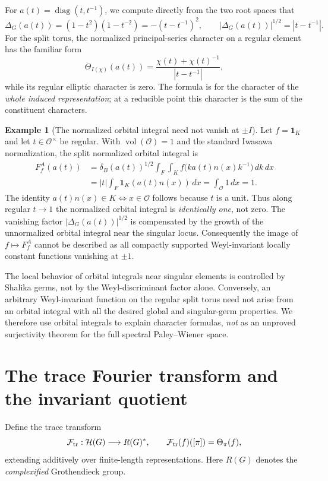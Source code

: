 \documentclass[12pt,letterpaper]{amsart}
\numberwithin{equation}{section}
\theoremstyle{definition}
\newtheorem{example}[theorem]{Example}
\theoremstyle{remark}
\newcommand{\calH}{\mathcal H}
\newcommand{\vol}{\operatorname{vol}}
\newcommand{\diag}{\operatorname{diag}}
\begin{document}
For $a(t)=\diag(t,t^{-1})$, we compute directly from the two root spaces that
\begin{equation}\label{eq:disc}
\Delta_G(a(t))=(1-t^2)(1-t^{-2})=-(t-t^{-1})^2,
\qquad |\Delta_G(a(t))|^{1/2}=|t-t^{-1}|.
\end{equation}
For the split torus, the normalized principal-series character on a regular element has the familiar form
\begin{equation}\label{eq:pschar}
\Theta_{I(\chi)}(a(t))=\frac{\chi(t)+\chi(t)^{-1}}{|t-t^{-1}|},
\end{equation}
while its regular elliptic character is zero.  The formula is for the character of the \emph{whole induced representation}; at a reducible point this character is the sum of the constituent characters.

\begin{example}[The normalized orbital integral need not vanish at $\pm I$]\label{ex:K}
Let $f=\mathbf 1_K$ and let $t\in\mathcal O^\times$ be regular. With $\vol(\mathcal O)=1$ and the standard Iwasawa normalization, the split normalized orbital integral is
\begin{align*}
F_f^A(a(t))
&=\delta_B(a(t))^{1/2}\int_F\int_K f\bigl(k a(t)n(x)k^{-1}\bigr)\,dk\,dx\\
&=|t|\int_F\mathbf 1_K(a(t)n(x))\,dx
=\int_{\mathcal O}1\,dx=1.
\end{align*}
The identity $a(t)n(x)\in K\iff x\in\mathcal O$ follows because $t$ is a unit. Thus along regular $t\to1$ the normalized orbital integral is \emph{identically one}, not zero.  The vanishing factor $|\Delta_G(a(t))|^{1/2}$ is compensated by the growth of the unnormalized orbital integral near the singular locus.  Consequently the image of $f\mapsto F_f^A$ cannot be described as all compactly supported Weyl-invariant locally constant functions vanishing at $\pm1$.
\end{example}

The local behavior of orbital integrals near singular elements is controlled by Shalika germs, not by the Weyl-discriminant factor alone.  Conversely, an arbitrary Weyl-invariant function on the regular split torus need not arise from an orbital integral with all the desired global and singular-germ properties.  We therefore use orbital integrals to explain character formulas, \emph{not} as an unproved surjectivity theorem for the full spectral Paley--Wiener space.

\section{The trace Fourier transform and the invariant quotient}\label{sec:cocenter}
Define the trace transform
\begin{equation}\label{eq:trace-map}
\mathcal F_{\rm tr}:\calH(G)\longrightarrow R(G)^*,\qquad
\mathcal F_{\rm tr}(f)([\pi])=\Theta_\pi(f),
\end{equation}
extending additively over finite-length representations. Here $R(G)$ denotes the \emph{complexified} Grothendieck group.
\end{document}
